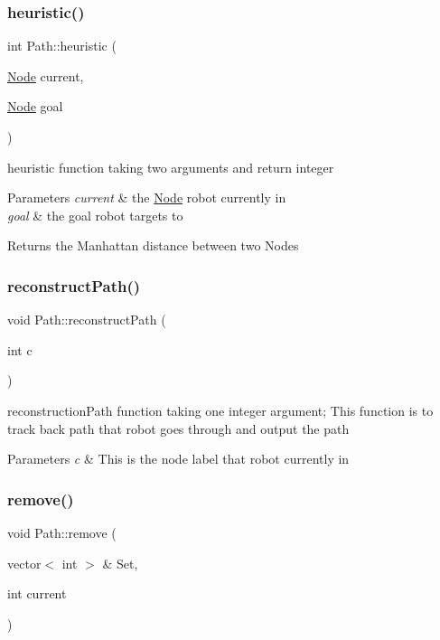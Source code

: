 \subsubsection{\texorpdfstring{heuristic()}{heuristic()}}
{\footnotesize\ttfamily int Path\+::heuristic (\begin{DoxyParamCaption}\item[{\hyperlink{classNode}{Node}}]{current,  }\item[{\hyperlink{classNode}{Node}}]{goal }\end{DoxyParamCaption})}



heuristic function taking two arguments and return integer 


\begin{DoxyParams}{Parameters}
{\em current} & the \hyperlink{classNode}{Node} robot currently in \\
\hline
{\em goal} & the goal robot targets to \\
\hline
\end{DoxyParams}
\begin{DoxyReturn}{Returns}
the Manhattan distance between two Nodes 
\end{DoxyReturn}
\mbox{\label{classPath_aef81fce3aff1781467bbd0c620220c78}} 
\subsubsection{\texorpdfstring{reconstruct\+Path()}{reconstructPath()}}
{\footnotesize\ttfamily void Path\+::reconstruct\+Path (\begin{DoxyParamCaption}\item[{int}]{c }\end{DoxyParamCaption})}

reconstruction\+Path function taking one integer argument; This function is to track back path that robot goes through and output the path 
\begin{DoxyParams}{Parameters}
{\em c} & This is the node label that robot currently in \\
\hline
\end{DoxyParams}
\mbox{\label{classPath_a27e051fa22336b2b3fbac553dc16ea58}} 
\subsubsection{\texorpdfstring{remove()}{remove()}}
{\footnotesize\ttfamily void Path\+::remove (\begin{DoxyParamCaption}\item[{vector$<$ int $>$ \&}]{Set,  }\item[{int}]{current }\end{DoxyParamCaption})}



